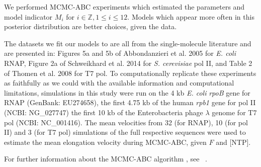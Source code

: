 \documentclass[10pt,letterpaper]{article}
\begin{document}
We performed MCMC-ABC experiments which estimated the parameters and model indicator $M_i$ for $i \in \mathbb{Z}, 1 \leq i \leq 12$. Models which appear more often in this posterior distribution are better choices, given the data. \par  



The datasets we fit our models to are all from the single-molecule literature and are presented in: Figures 5a and 5b of Abbondanzieri et al. 2005 \cite{abbondanzieri2005direct} for \textit{ E. coli} RNAP, Figure 2a of Schweikhard et al. 2014 \cite{schweikhard2014transcription} for \textit{ S. cerevisiae} pol II, and Table 2 of Thomen et al. 2008 \cite{thomen2008t7} for T7 pol. To computationally replicate these experiments as faithfully as we could with the available information and computational limitations, simulations in this study were run on the 4 kb \textit{E. coli} \textit{rpoB} gene for RNAP (GenBank: EU274658), the first 4.75 kb of the human \textit{ rpb1} gene for pol II (NCBI: NG\_027747) the first 10 kb of the Enterobacteria phage $\lambda$ genome for T7 pol (NCBI: NC\_001416). The mean velocities from 32 (for RNAP), 10 (for pol II) and 3 (for T7 pol) simulations of the full respective sequences were used to estimate the mean elongation velocity during MCMC-ABC, given $F$ and [NTP].  \par

For further information about the MCMC-ABC algorithm \cite{beaumont2010approximate, csillery2010approximate}, see ~.
\end{document}
